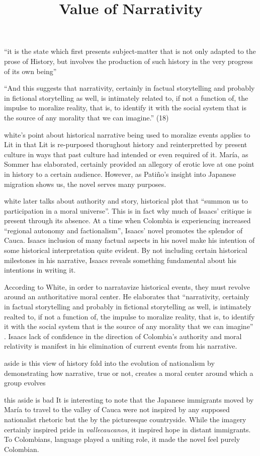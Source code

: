 \documentclass[12pt]{article}
\title{Value of Narrativity}
\makeatletter
\newcommand\iraggedright{%
	\let\\\@centercr\@rightskip\@flushglue \rightskip\@rightskip
	\leftskip\z@skip}
\makeatother
\begin{document}
	\makeheader
	\iraggedright

\enquote{it is the state which first presents subject-matter that is not only adapted to the prose of History, but involves the production of such history in the very progress of its own being}

\enquote{And  this 	suggests 	that 	narrativity, 	certainly 	in  factual 	storytelling 	and 	probably 	in  fictional 	storytelling 	as 	well, is 	intimately 	related  to, if not a function  of,  the 	impulse 	to moralize 	reality, 	that is, to 	identify 	it with the social 	system 	that is the source of 	any 	morality 	that we can 	imagine.} (18)

white's point about historical narrative being used to moralize events applies to Lit in that Lit is re-purposed thorughout history and reinterpretted by present culture in ways that past culture had intended or even required of it. María, as Sommer has elaborated, certainly provided an allegory of erotic love at one point in history to a certain audience. However, as Patiño's insight into Japanese migration shows us, the novel serves many purposes.

white later talks about authority and story, historical plot that \enquote{summon us to participation in a moral universe}. This is in fact why much of Isaacs' critique is present through its absence. At a time when Colombia is experiencing increased \enquote{regional autonomy and factionalism}, Isaacs' novel promotes the splendor of Cauca. Isaacs inclusion of many factual aspects in his novel make his intention of some historical interpretation quite evident. By not including certain historical milestones in his narrative, Isaacs reveals something fundamental about his intentions in writing it. 

According to White, in order to narratavize historical events, they must revolve around an authoritative moral center. He elaborates that \enquote{narrativity, certainly in factual storytelling and probably in fictional storytelling as well, is intimately realted to, if not a function of, the impulse to moralize reality, that is, to identify it with the social system that is the source of any morality that we can imagine} \cite[18]{White1980}. Isaacs lack of confidence in the direction of Colombia's authority and moral relativity is manifest in his elimination of current events from his narrative. 


aside
is this view of history fold into the evolution of nationalism by demonstrating how narrative, true or not, creates a moral center around which a group evolves

this aside is bad
It is interesting to note that the Japanese immigrants moved by María to travel to the valley of Cauca were not inspired by any supposed nationalist rhetoric but the by the picturesque countryside. While the imagery certainly inspired pride in \textit{vallecaucanos}, it inspired hope in distant immigrants. To Colombians, language played a uniting role, it made the novel feel purely Colombian. 
\end{document}
